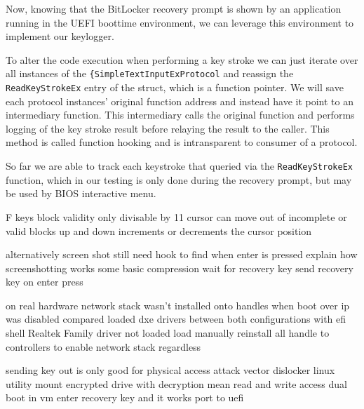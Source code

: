 Now, knowing that the BitLocker recovery prompt is shown by an application running in the UEFI boottime environment, we can leverage this environment to implement our keylogger.

To alter the code execution when performing a key stroke we can just iterate over all instances of the \lstinline{{SimpleTextInputExProtocol} and reassign the \lstinline{ReadKeyStrokeEx} entry of the struct, which is a function pointer. We will save each protocol instances' original function address and instead have it point to an intermediary function. This intermediary calls the original function and performs logging of the key stroke result before relaying the result to the caller. This method is called function hooking and is intransparent to consumer of a protocol.



So far we are able to track each keystroke that queried via the \lstinline{ReadKeyStrokeEx} function, which in our testing is only done during the recovery prompt, but may be used by BIOS interactive menu.

F keys
block validity
only divisable by 11
cursor can move out of incomplete or valid blocks
up and down increments or decrements the cursor position

alternatively screen shot
still need hook to find when enter is pressed
explain how screenshotting works
some basic compression
wait for recovery key
send recovery key on enter press

on real hardware
network stack wasn't installed onto handles when boot over ip was disabled
compared loaded dxe drivers between both configurations with efi shell
Realtek Family driver not loaded
load manually
reinstall all handle to controllers to enable network stack regardless

sending key out is only good for physical access attack vector
dislocker linux utility
\cite{dislocker}
mount encrypted drive with decryption mean
read and write access
dual boot in vm
enter recovery key and it works
port to uefi

